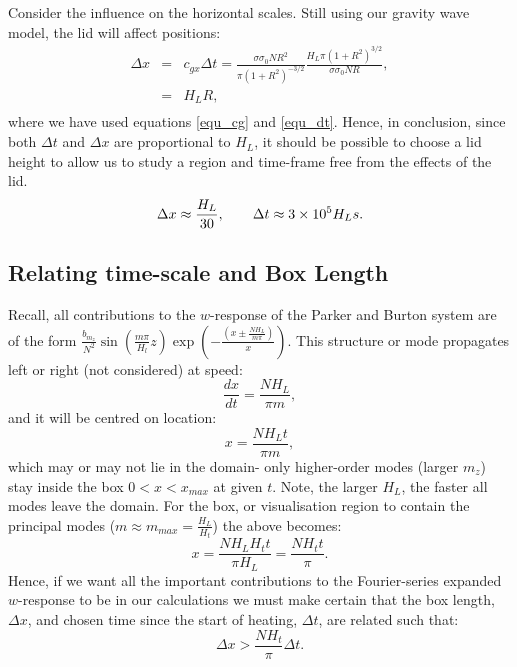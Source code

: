 \documentclass[12pt]{article}
\begin{document}
Consider the influence on the horizontal scales. Still using our gravity wave model, the lid will affect positions:
%
\begin{eqnarray}
\Delta x & = & c_{gx} \Delta t =  \frac{ \sigma \sigma_0 N R^2}{ \pi (1 + R^2)^{-3/2}}  \frac {H_L \pi (1+R^2)^{3/2}} { \sigma \sigma_0 N R } , \\ \nonumber
            & = & H_L R, \\ \nonumber
\end{eqnarray}
%
where we have used equations \ref{equ_cg} and \ref{equ_dt}.  Hence, in conclusion, since both $\Delta t$ and $\Delta x$ are proportional to $H_L$, it should be possible to choose a lid height to allow us to study a region and time-frame free from the effects of the lid.
%
\begin{equation}
\Delta x \approx \frac{H_L}{30}, \quad \quad \Delta t \approx 3 \times 10^5 H_L s.  \\ \nonumber
\end{equation}
%
%
%
\subsection{Relating time-scale and Box Length}
%
Recall, all contributions to the $w$-response of the Parker and Burton system are of the form 
$\frac{b_{m_z}}{N^2} \sin \left( \frac{m \pi}{H_l} z \right) \exp \left( - \frac{(x \pm \frac{NH_L}{m \pi} )}{x} \right)$. This 
structure or mode propagates left or right (not considered) at speed:
% 
\begin{equation}
\frac{dx}{dt} = \frac{NH_L}{\pi m},
\end{equation}
%
and it will be centred on location:
% 
\begin{equation}
x = \frac{NH_L t}{\pi m}, 
\end{equation}
%
which may or may not lie in the domain- only higher-order modes (larger $m_z$) stay inside the box $0<x<x_{max}$ at given $t$. Note, the larger $H_L$, the faster all modes leave the domain. For the box, or visualisation region to contain the principal modes ($m \approx m_{max}=\frac{H_L}{H_t}$) the above becomes:
% 
\begin{equation}
x = \frac{NH_L  H_t t}{\pi H_L} = \frac{N H_t t}{\pi}. 
\end{equation}
%
Hence, if we want all the important contributions to the Fourier-series expanded $w$-response to be in our calculations we must make certain 
that the box length, $\Delta x$, and chosen time since the start of heating, $\Delta t$, are related such that:
\begin{equation}
\Delta x >  \frac{N H_t }{\pi} \Delta t. 
\end{equation}
%
\end{document}
